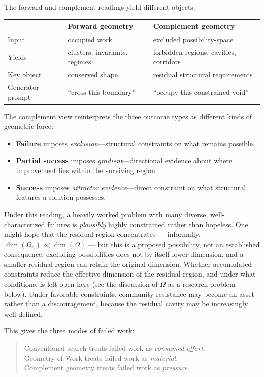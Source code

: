 \documentclass[11pt]{article}
\theoremstyle{gowthm}
\theoremstyle{gowplain}
\begin{document}
The forward and complement readings yield different objects:

\begin{center}
\begin{tabular}{lll}
\toprule
& \textbf{Forward geometry} & \textbf{Complement geometry} \\
\midrule
Input & occupied work & excluded possibility-space \\
Yields & clusters, invariants, regimes & forbidden regions, cavities, corridors \\
Key object & conserved shape & residual structural requirements \\
Generator prompt & ``cross this boundary'' & ``occupy this constrained void'' \\
\bottomrule
\end{tabular}
\end{center}

The complement view reinterprets the three outcome types as different kinds of
geometric force:
\begin{itemize}[nosep]
  \item \textbf{Failure} imposes \emph{exclusion}---structural constraints on
    what remains possible.
  \item \textbf{Partial success} imposes \emph{gradient}---directional evidence
    about where improvement lies within the surviving region.
  \item \textbf{Success} imposes \emph{attractor evidence}---direct constraint
    on what structural features a solution possesses.
\end{itemize}

Under this reading, a heavily worked problem with many diverse, well-characterized
failures is \emph{plausibly} highly constrained rather than hopeless. One might
hope that the residual region concentrates --- informally, $\dim(\Omega_n) \ll
\dim(\Omega)$ --- but this is a proposed possibility, not an established
consequence: excluding possibilities does not by itself lower dimension, and a
smaller residual region can retain the original dimension. Whether accumulated
constraints reduce the effective dimension of the residual region, and under
what conditions, is left open here (see the discussion of $\Omega$ as a research
problem below). Under favorable constraints, community resistance may become an
asset rather than a discouragement, because the residual cavity may be
increasingly well defined.

This gives the three modes of failed work:
\begin{quote}
Conventional search treats failed work as \emph{consumed effort}.\\
Geometry of Work treats failed work as \emph{material}.\\
Complement geometry treats failed work as \emph{pressure}.
\end{quote}
\end{document}
